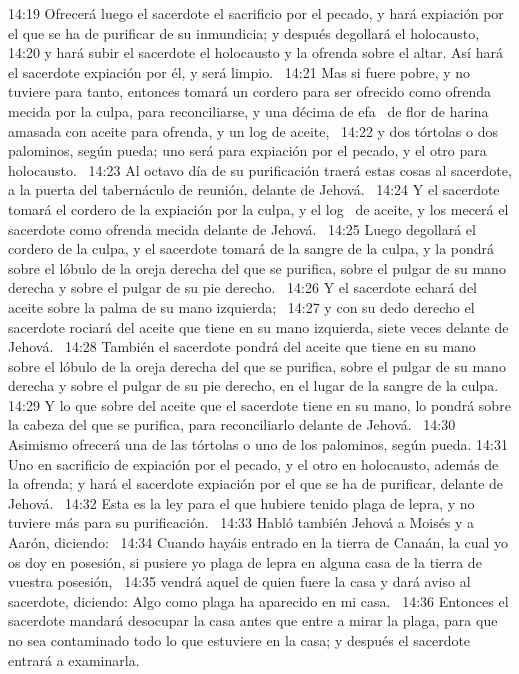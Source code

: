 14:19 Ofrecerá luego el sacerdote el sacrificio por el pecado, y hará expiación por el que se ha de purificar de su inmundicia; y después degollará el holocausto,  
14:20 y hará subir el sacerdote el holocausto y la ofrenda sobre el altar. Así hará el sacerdote expiación por él, y será limpio.  
14:21 Mas si fuere pobre, y no tuviere para tanto, entonces tomará un cordero para ser ofrecido como ofrenda mecida por la culpa, para reconciliarse, y una décima de efa  de flor de harina amasada con aceite para ofrenda, y un log de aceite,  
14:22 y dos tórtolas o dos palominos, según pueda; uno será para expiación por el pecado, y el otro para holocausto.  
14:23 Al octavo día de su purificación traerá estas cosas al sacerdote, a la puerta del tabernáculo de reunión, delante de Jehová.  
14:24 Y el sacerdote tomará el cordero de la expiación por la culpa, y el log  de aceite, y los mecerá el sacerdote como ofrenda mecida delante de Jehová.  
14:25 Luego degollará el cordero de la culpa, y el sacerdote tomará de la sangre de la culpa, y la pondrá sobre el lóbulo de la oreja derecha del que se purifica, sobre el pulgar de su mano derecha y sobre el pulgar de su pie derecho.  
14:26 Y el sacerdote echará del aceite sobre la palma de su mano izquierda;  
14:27 y con su dedo derecho el sacerdote rociará del aceite que tiene en su mano izquierda, siete veces delante de Jehová.  
14:28 También el sacerdote pondrá del aceite que tiene en su mano sobre el lóbulo de la oreja derecha del que se purifica, sobre el pulgar de su mano derecha y sobre el pulgar de su pie derecho, en el lugar de la sangre de la culpa.  
14:29 Y lo que sobre del aceite que el sacerdote tiene en su mano, lo pondrá sobre la cabeza del que se purifica, para reconciliarlo delante de Jehová.  
14:30 Asimismo ofrecerá una de las tórtolas o uno de los palominos, según pueda. 
14:31 Uno en sacrificio de expiación por el pecado, y el otro en holocausto, además de la ofrenda; y hará el sacerdote expiación por el que se ha de purificar, delante de Jehová.  
14:32 Esta es la ley para el que hubiere tenido plaga de lepra, y no tuviere más para su purificación.  
14:33 Habló también Jehová a Moisés y a Aarón, diciendo:  
14:34 Cuando hayáis entrado en la tierra de Canaán, la cual yo os doy en posesión, si pusiere yo plaga de lepra en alguna casa de la tierra de vuestra posesión,  
14:35 vendrá aquel de quien fuere la casa y dará aviso al sacerdote, diciendo: Algo como plaga ha aparecido en mi casa.  
14:36 Entonces el sacerdote mandará desocupar la casa antes que entre a mirar la plaga, para que no sea contaminado todo lo que estuviere en la casa; y después el sacerdote entrará a examinarla.  
